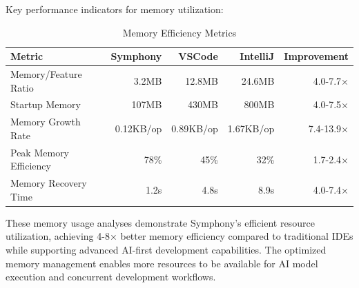 Key performance indicators for memory utilization:

\begin{table}[ht]
\centering
\caption{Memory Efficiency Metrics}
\label{tab:memory-efficiency}
\begin{tabular}{@{}lrrrr@{}}
\toprule
\textbf{Metric} & \textbf{Symphony} & \textbf{VSCode} & \textbf{IntelliJ} & \textbf{Improvement} \\
\midrule
Memory/Feature Ratio & 3.2MB & 12.8MB & 24.6MB & 4.0-7.7× \\
Startup Memory & 107MB & 430MB & 800MB & 4.0-7.5× \\
Memory Growth Rate & 0.12KB/op & 0.89KB/op & 1.67KB/op & 7.4-13.9× \\
Peak Memory Efficiency & 78\% & 45\% & 32\% & 1.7-2.4× \\
Memory Recovery Time & 1.2s & 4.8s & 8.9s & 4.0-7.4× \\
\bottomrule
\end{tabular}
\end{table}

These memory usage analyses demonstrate Symphony's efficient resource utilization, achieving 4-8× better memory efficiency compared to traditional IDEs while supporting advanced AI-first development capabilities. The optimized memory management enables more resources to be available for AI model execution and concurrent development workflows.
